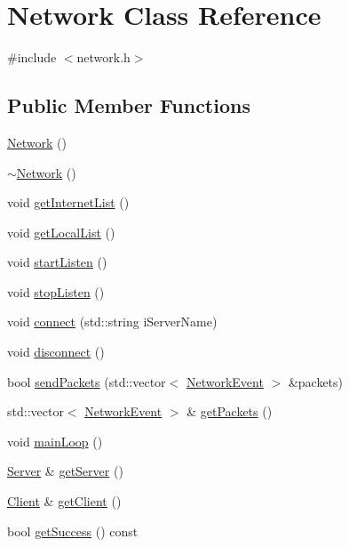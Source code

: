 \hypertarget{class_network}{\section{Network Class Reference}
\label{class_network}
}


{\ttfamily \#include $<$network.\-h$>$}

\subsection*{Public Member Functions}
\begin{DoxyCompactItemize}
\item 
\hyperlink{class_network_a3cc2fb4f8fa4d507077e8da85ce5a1c8}{Network} ()
\item 
\hyperlink{class_network_a7a4e19cdb4bf0c7ecf82baa643831492}{$\sim$\-Network} ()
\item 
void \hyperlink{class_network_ad14847f8c3d10779a4fcaba08f88b6d6}{get\-Internet\-List} ()
\item 
void \hyperlink{class_network_a1b8853bc8d74bdc7e9fde02eacdf8cc2}{get\-Local\-List} ()
\item 
void \hyperlink{class_network_ab9fe53ec67f7eae4a1e01fd474590957}{start\-Listen} ()
\item 
void \hyperlink{class_network_ac45c78cca08f2123d9394a0a3c70d284}{stop\-Listen} ()
\item 
void \hyperlink{class_network_a6764800f1193201780329d32b1f0e10c}{connect} (std\-::string i\-Server\-Name)
\item 
void \hyperlink{class_network_ae44f73c87e85de6353c6365e5b86d911}{disconnect} ()
\item 
bool \hyperlink{class_network_a2f3a8809597f956dbf0c11a649ccf054}{send\-Packets} (std\-::vector$<$ \hyperlink{class_network_event}{Network\-Event} $>$ \&packets)
\item 
std\-::vector$<$ \hyperlink{class_network_event}{Network\-Event} $>$ \& \hyperlink{class_network_a6a85de91153350bca2776e092a524dd1}{get\-Packets} ()
\item 
void \hyperlink{class_network_a606848acb944241f270f52cd2a966b3b}{main\-Loop} ()
\item 
\hyperlink{class_server}{Server} \& \hyperlink{class_network_a6ec7cd6cb8fe04de45f6bf1e7efa8660}{get\-Server} ()
\item 
\hyperlink{class_client}{Client} \& \hyperlink{class_network_ab08b428a2f7cdbdf3cb7fd5e7e32d8ca}{get\-Client} ()
\item 
bool \hyperlink{class_network_a614afe83d863bafca483956b1ca43ca0}{get\-Success} () const 
\end{DoxyCompactItemize}


